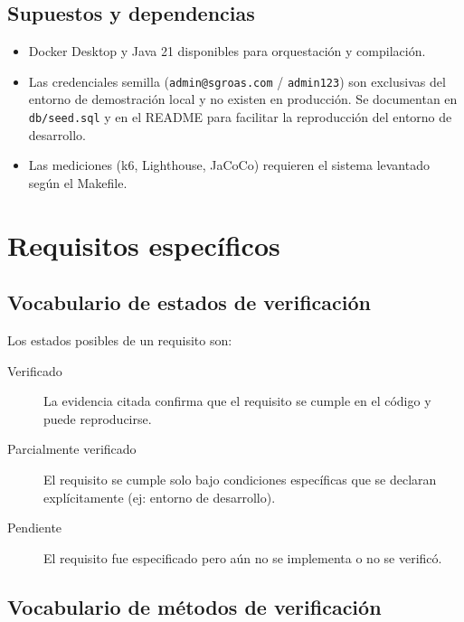 \documentclass[12pt,a4paper]{article}
\begin{document}
\subsection{Supuestos y dependencias}
\begin{itemize}
  \item Docker Desktop y Java 21 disponibles para orquestación y compilación.
  \item Las credenciales semilla (\texttt{admin@sgroas.com} / \texttt{admin123}) son exclusivas del entorno de demostración local y no existen en producción. Se documentan en \texttt{db/seed.sql} y en el README para facilitar la reproducción del entorno de desarrollo.
  \item Las mediciones (k6, Lighthouse, JaCoCo) requieren el sistema levantado según el Makefile.
\end{itemize}

\clearpage

\section{Requisitos específicos}
\label{sec:requisitos}

\subsection{Vocabulario de estados de verificación}
\label{sec:estados}

Los estados posibles de un requisito son:
\begin{description}
  \item[Verificado] La evidencia citada confirma que el requisito se cumple en el código y puede reproducirse.
  \item[Parcialmente verificado] El requisito se cumple solo bajo condiciones específicas que se declaran explícitamente (ej: entorno de desarrollo).
  \item[Pendiente] El requisito fue especificado pero aún no se implementa o no se verificó.
\end{description}

\subsection{Vocabulario de métodos de verificación}
\label{sec:metodos}
\end{document}
